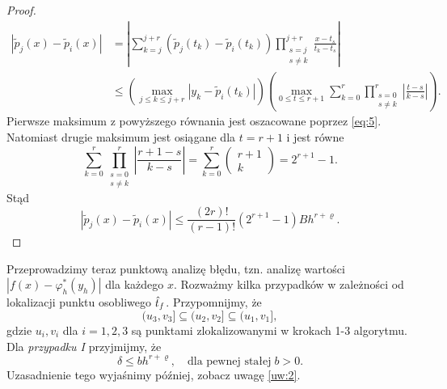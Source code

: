 \documentclass[oik, pdftex, man]{mgrwms}
\begin{document}
\begin{proof}
        \begin{equation} \label{eq:28}
            \begin{aligned}
                \left|\tilde{p}_{j}(x)-\tilde{p}_{i}(x)\right| &=\left|\sum_{k=j}^{j+r}\left(\tilde{p}_{j}\left(t_{k}\right)-\tilde{p}_{i}\left(t_{k}\right)\right) \prod_{\substack{s=j \\ s \neq k}}^{j+r} \frac{x-t_{s}}{t_{k}-t_{s}}\right| \\
                & \leq\left(\max _{j \leq k \leq j+r}\left|y_{k}-\tilde{p}_{i}\left(t_{k}\right)\right|\right)\left(\max _{0 \leq t \leq r+1} \sum_{k=0}^{r} \prod_{\substack{s=0 \\ s \neq k}}^{r}\left|\frac{t-s}{k-s}\right|\right).
            \end{aligned}                
        \end{equation}
        Pierwsze maksimum z powyższego równania jest oszacowane poprzez \eqref{eq:5}. Natomiast drugie maksimum jest osiągane dla $t=r+1$ i jest równe
        \begin{equation*}
            \sum_{k=0}^{r} \prod_{\substack{s=0 \\ s \neq k}}^{r}\left|\frac{r+1-s}{k-s}\right|=\sum_{k=0}^{r}\left(\begin{array}{c} r+1 \\ k\end{array}\right)=2^{r+1}-1.
        \end{equation*}
        Stąd
        \begin{equation*}
            \left|\tilde{p}_{j}(x)-\tilde{p}_{i}(x)\right| \leq \frac{(2 r) !}{(r-1) !}\left(2^{r+1}-1\right) B h^{r+\varrho}.
        \end{equation*}
    \end{proof}

    Przeprowadzimy teraz punktową analizę błędu, tzn. analizę wartości $|f(x) - \varphi_{h}^{*}(y_h)|$ dla każdego $x$. Rozważmy kilka przypadków w zależności od lokalizacji punktu osobliwego $\hat{t}_{f}$. Przypomnijmy, że
    \begin{equation*}
        (u_{3}, v_{3}] \subseteq (u_{2}, v_{2}] \subseteq (u_{1}, v_{1}],
    \end{equation*}
    gdzie $u_{i}, v_{i}$ dla $i=1,2,3$ są punktami zlokalizowanymi w krokach 1-3 algorytmu. Dla \textit{przypadku I} przyjmijmy, że
    \begin{equation} \label{eq:algMP_7}
        \delta \leq b h^{r+\varrho}, \quad \text{dla pewnej stałej}\; b>0.
    \end{equation}
    Uzasadnienie tego wyjaśnimy później, zobacz uwagę \ref{uw:2}.
\end{document}

